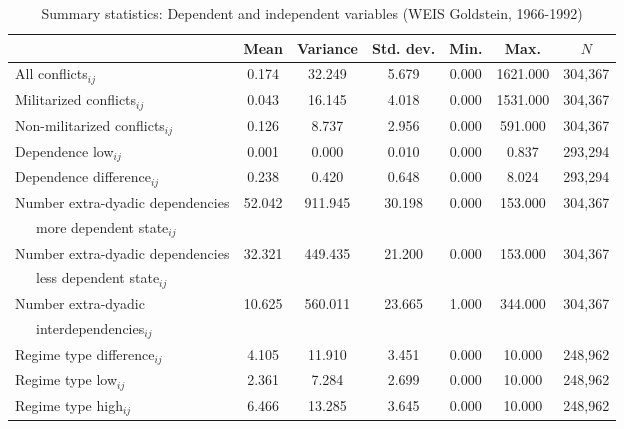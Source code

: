 \begin{table}[htbp]\centering\scriptsize
\caption{Summary statistics: Dependent and independent variables (WEIS Goldstein, 1966-1992) \label{tab2:summarystatsallvargoldstein}}
\def\sym#1{\ifmmode^{#1}\else\(^{#1}\)\fi}
\begin{tabular}{l*{1}{cccccc}}
\toprule
            &        Mean&         Variance&          Std. dev.&         Min.&         Max.&       $N$\\
\midrule
All conflicts$_{ij}$&       0.174&      32.249&       5.679&       0.000&    1621.000&      304,367\\
Militarized conflicts$_{ij}$&       0.043&      16.145&       4.018&       0.000&    1531.000&      304,367\\
Non-militarized conflicts$_{ij}$&       0.126&       8.737&       2.956&       0.000&     591.000&      304,367\\
Dependence low$_{ij}$&       0.001&       0.000&       0.010&       0.000&       0.837&      293,294\\
Dependence difference$_{ij}$&       0.238&       0.420&       0.648&       0.000&       8.024&      293,294\\
Number extra-dyadic dependencies&      52.042&     911.945&      30.198&       0.000&     153.000&      304,367\\
~~~more dependent state$_{ij}$&           &             &               &              &              &                 \\
Number extra-dyadic dependencies&      32.321&     449.435&      21.200&       0.000&     153.000&      304,367\\
~~~less dependent state$_{ij}$&            &              &              &              &              &           \\
Number extra-dyadic&      10.625&     560.011&      23.665&       1.000&     344.000&      304,367\\
~~~interdependencies$_{ij}$&                &              &           &             &           &              \\
Regime type difference$_{ij}$     &       4.105&      11.910&       3.451&       0.000&      10.000&      248,962\\
Regime type low$_{ij}$       &       2.361&       7.284&       2.699&       0.000&      10.000&      248,962\\
Regime type high$_{ij}$       &       6.466&      13.285&       3.645&       0.000&      10.000&      248,962\\

\end{tabular}
\end{table}

